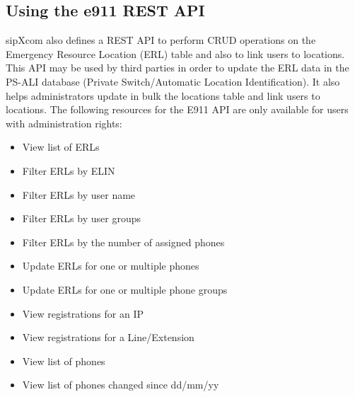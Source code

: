 \documentclass[letterpaper,10pt,english]{sphinxmanual}
\begin{document}
\subsection{Using the e911 REST API}
\label{\detokenize{restapi:using-the-e911-rest-api}}
sipXcom also defines a REST API to perform CRUD operations on the Emergency Resource Location (ERL) table and also to link users to locations. This API may be used by third parties in order to update the ERL data in the PS-ALI database (Private Switch/Automatic Location Identification). It also helps administrators update in bulk the locations table and link users to locations.
The following resources for the E911 API are only available for users with administration rights:

\begin{itemize}
\item {} 
View list of ERLs

\item {} 
Filter ERLs by ELIN

\item {} 
Filter ERLs by user name

\item {} 
Filter ERLs by user groups

\item {} 
Filter ERLs by the number of assigned phones

\item {} 
Update ERLs for one or multiple phones

\item {} 
Update ERLs for one or multiple phone groups

\end{itemize}

\begin{itemize}
\item {} 
View registrations for an IP

\item {} 
View registrations for a Line/Extension

\end{itemize}

\begin{itemize}
\item {} 
View list of phones

\item {} 
View list of phones changed since dd/mm/yy

\end{itemize}
\end{document}

